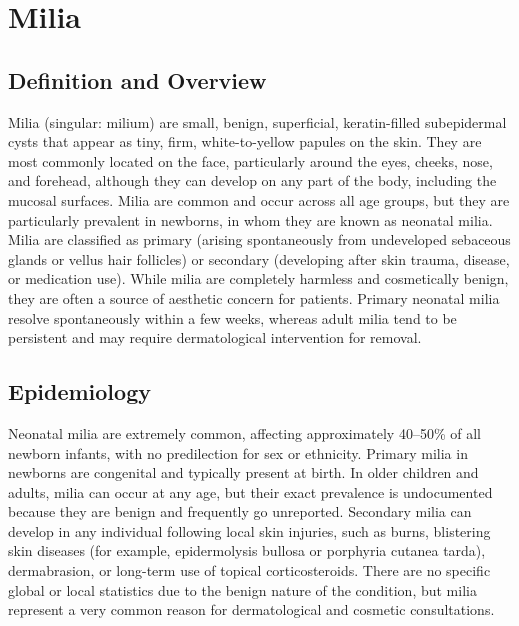\chapter{Milia}

\section*{Definition and Overview}
Milia (singular: milium) are small, benign, superficial, keratin-filled subepidermal cysts that appear as tiny, firm, white-to-yellow papules on the skin. They are most commonly located on the face, particularly around the eyes, cheeks, nose, and forehead, although they can develop on any part of the body, including the mucosal surfaces. Milia are common and occur across all age groups, but they are particularly prevalent in newborns, in whom they are known as neonatal milia. Milia are classified as primary (arising spontaneously from undeveloped sebaceous glands or vellus hair follicles) or secondary (developing after skin trauma, disease, or medication use). While milia are completely harmless and cosmetically benign, they are often a source of aesthetic concern for patients. Primary neonatal milia resolve spontaneously within a few weeks, whereas adult milia tend to be persistent and may require dermatological intervention for removal.

\section*{Epidemiology}
Neonatal milia are extremely common, affecting approximately 40--50\% of all newborn infants, with no predilection for sex or ethnicity. Primary milia in newborns are congenital and typically present at birth. In older children and adults, milia can occur at any age, but their exact prevalence is undocumented because they are benign and frequently go unreported. Secondary milia can develop in any individual following local skin injuries, such as burns, blistering skin diseases (for example, epidermolysis bullosa or porphyria cutanea tarda), dermabrasion, or long-term use of topical corticosteroids. There are no specific global or local statistics due to the benign nature of the condition, but milia represent a very common reason for dermatological and cosmetic consultations.

